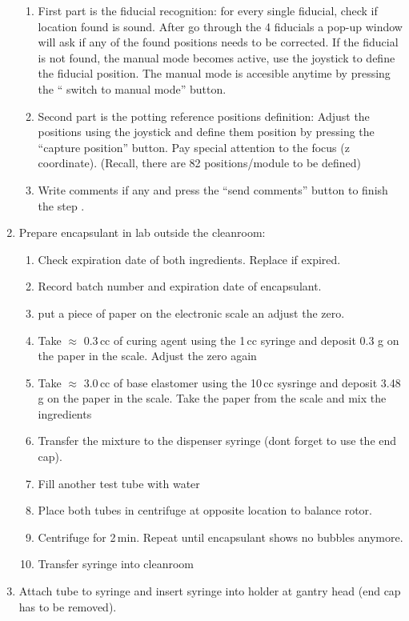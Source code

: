 \documentclass[12pt]{unlsilabsop}
\begin{document}
\begin{enumerate}
\begin{enumerate}
    \item First part is the fiducial recognition: for every single fiducial, check if location found is sound. After go through the 4 fiducials a pop-up window will ask if any of the found positions needs to be corrected. If the fiducial is not found, the manual mode becomes active, use the joystick to define the fiducial position. The manual mode is accesible anytime by pressing the `` switch to manual mode'' button.   
    \item Second part is the potting reference positions definition: Adjust the positions using the joystick and define them position by pressing the ``capture position'' button. Pay special attention to the focus (z coordinate). (Recall, there are 82 positions/module to be defined) 
    \item Write comments if any and press the ``send comments'' button to finish the step .
    \end{enumerate}
  \item Prepare encapsulant in lab outside the cleanroom:\label{enum:prepencapsulant}
    \begin{enumerate}
        \item Check expiration date of both ingredients. Replace if expired.
	\item Record batch number and expiration date of encapsulant.
        \item put a piece of paper on the electronic scale an adjust the zero.
	\item Take $\approx$ 0.3\,cc of curing agent using the 1\,cc syringe and deposit 0.3 g on the paper in the scale. Adjust the zero again 
        \item Take $\approx$ 3.0\,cc of base elastomer using the 10\,cc sysringe and deposit 3.48 g on the paper in the scale. Take the paper from the scale and mix the ingredients
        \item Transfer the mixture to the dispenser syringe (dont forget to use the end cap).  
	\item Fill another test tube with water
	\item Place both tubes in centrifuge at opposite location to balance rotor.
	\item Centrifuge for 2\,min. Repeat until encapsulant shows no bubbles anymore.
	\item Transfer syringe into cleanroom
    \end{enumerate}
    \item Attach tube to syringe and insert syringe into holder at gantry head (end cap has to be removed).

\end{enumerate}
\end{document}
